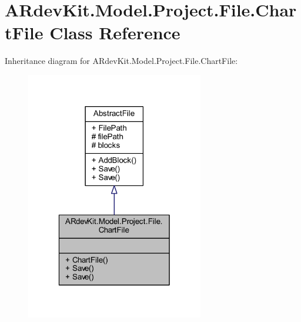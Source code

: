 \hypertarget{class_a_rdev_kit_1_1_model_1_1_project_1_1_file_1_1_chart_file}{\section{A\-Rdev\-Kit.\-Model.\-Project.\-File.\-Chart\-File Class Reference}
\label{class_a_rdev_kit_1_1_model_1_1_project_1_1_file_1_1_chart_file}
}


Inheritance diagram for A\-Rdev\-Kit.\-Model.\-Project.\-File.\-Chart\-File\-:
\nopagebreak
\begin{figure}[H]
\begin{center}
\leavevmode
\includegraphics[width=220pt]{class_a_rdev_kit_1_1_model_1_1_project_1_1_file_1_1_chart_file__inherit__graph}
\end{center}
\end{figure}


